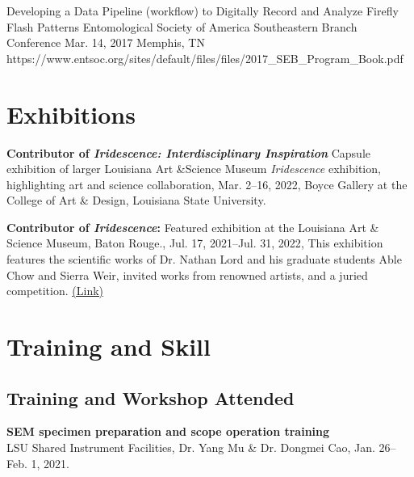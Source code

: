 \documentclass{article}
\newcommand{\hindent}{\hangindent=10pt}
\begin{document}
{Developing a Data Pipeline (workflow) to Digitally Record and Analyze Firefly Flash Patterns}
{Entomological Society of America Southeastern Branch Conference}
{Mar. 14, 2017}
{Memphis, TN}
{https://www.entsoc.org/sites/default/files/files/2017_SEB_Program_Book.pdf}


\section{Exhibitions}

\newcommand{\exhibition}[4]{
    \noindent
    \hindent
    \small
    \textbf{#1} %
    {#2}, %
    {#3}, %
    {#4} %
    \normalsize \par
}

\exhibition{Contributor of \textit{Iridescence: Interdisciplinary Inspiration}}
{Capsule exhibition of larger Louisiana Art \&Science Museum \textit{Iridescence} exhibition, highlighting art and science collaboration}
{Mar. 2--16, 2022}
{Boyce Gallery at the College of Art \& Design, Louisiana State University.}

\exhibition {Contributor of \textit{Iridescence}:}
{Featured exhibition at the Louisiana Art \& Science Museum, Baton Rouge.} 
{Jul. 17, 2021--Jul. 31, 2022}
{This exhibition features the scientific works of Dr. Nathan Lord and his graduate students Able Chow and Sierra Weir, invited works from renowned artists, and a juried competition. \href{https://www.exploreiridescence.com/}{(Link)}}

\section{Training and Skill}
\subsection{Training and Workshop Attended}
\newcommand{\train}[4]{
    \noindent
    \hindent
    \textbf{#1}\\ %
    {#2}, %
    {#3}, %
    \small{#4}. %
    \par\normalsize
}

\train{SEM specimen preparation and scope operation training}
{LSU Shared Instrument Facilities}
{Dr. Yang Mu \& Dr. Dongmei Cao}
{Jan. 26--Feb. 1, 2021}
\end{document}
